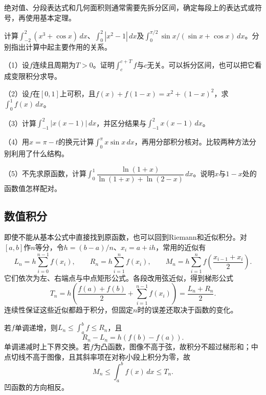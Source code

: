绝对值、分段表达式和几何面积则通常需要先拆分区间，确定每段上的表达式或符号，再使用基本定理。

\begin{example}
计算\(\int_{-2}^2(x^3+\cos x)\,dx\)、\(\int_0^2|x^2-1|\,dx\)及\(\int_0^{\pi/2}\sin x/(\sin x+\cos x)\,dx\)。分别指出计算中起主要作用的关系。
\end{example}

\begin{exercise}
\mbox{}\par\nobreak

（1）设\(f\)连续且周期为\(T>0\)。证明\(\int_c^{c+T}f\)与\(c\)无关。可以拆分区间，也可以把它看成变限积分求导。

（2）设\(f\)在\([0,1]\)上可积，且\(f(x)+f(1-x)=x^2+(1-x)^2\)，求\(\int_0^1f(x)\,dx\)。

（3）计算\(\int_{-1}^2|x(x-1)|\,dx\)，并区分结果与\(\int_{-1}^2x(x-1)\,dx\)。

（4）用\(x=\pi-t\)的换元计算\(\int_0^\pi x\sin x\,dx\)，再用分部积分核对。比较两种方法分别利用了什么结构。

（5）不先求原函数，计算\(\int_0^1\dfrac{\ln(1+x)}{\ln(1+x)+\ln(2-x)}\,dx\)。说明\(x\)与\(1-x\)处的函数值怎样配对。
\end{exercise}

\subsection{数值积分}

即使不能从基本公式中直接找到原函数，也可以回到Riemann和近似积分。对\([a,b]\)作\(n\)等分，令\(h=(b-a)/n\)、\(x_i=a+ih\)，常用的近似有
\begin{equation*}
 L_n=h\sum_{i=0}^{n-1}f(x_i),\qquad
 R_n=h\sum_{i=1}^nf(x_i),\qquad
 M_n=h\sum_{i=1}^nf\!\left(\frac{x_{i-1}+x_i}{2}\right).
\end{equation*}
它们依次为左、右端点与中点矩形公式。各段改用弦近似，得到{\heiti{}梯形公式}
\begin{equation*}
 T_n=h\left(\frac{f(a)+f(b)}2+\sum_{i=1}^{n-1}f(x_i)\right)
 =\frac{L_n+R_n}{2}.
\end{equation*}
连续性保证这些近似都趋于积分，但固定\(n\)时的误差还取决于函数的变化。

若\(f\)单调递增，则\(L_n\le\int_a^b f\le R_n\)，且
\begin{equation*}
 R_n-L_n=h(f(b)-f(a)).
\end{equation*}
单调递减时上下界交换。若\(f\)为凸函数，图像不高于弦，故积分不超过梯形和；中点切线不高于图像，且其斜率项在对称小段上积分为零，故
\begin{equation*}
 M_n\le\int_a^b f(x)\,dx\le T_n.
\end{equation*}
凹函数的方向相反。

